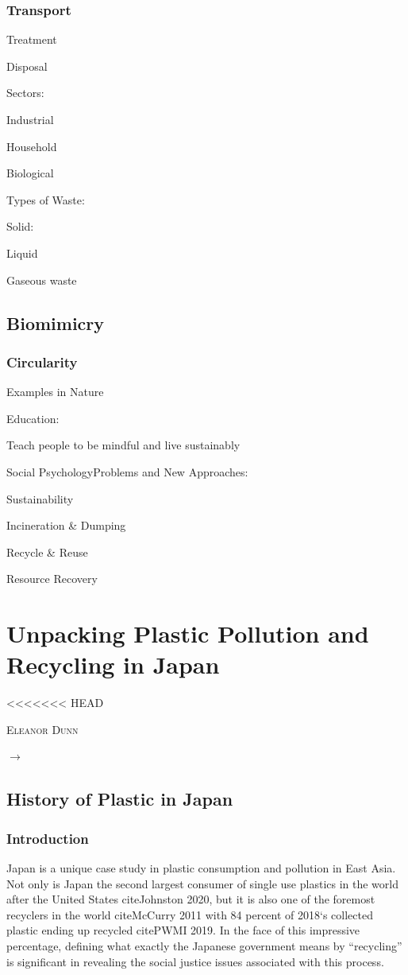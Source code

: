 \documentclass{book}\usepackage{knitr}
\makeatletter
\newcommand{\chapterauthor}[1]{%
  {\parindent0pt\vspace*{-25pt}%
  \linespread{1.1}\large\scshape#1%
  \par\nobreak\vspace*{35pt}}
  \@afterheading%
}
\makeatother
\begin{document}
\subsection{Transport}

Treatment

Disposal

Sectors:

Industrial

Household

Biological 

Types of Waste:

Solid:

Liquid

Gaseous waste

\section{Biomimicry}

\subsection{Circularity}

Examples in Nature

Education:

Teach people to be mindful and live sustainably

Social PsychologyProblems and New Approaches: 

Sustainability

Incineration \& Dumping

Recycle \& Reuse

Resource Recovery


\chapter{Unpacking Plastic Pollution and Recycling in Japan}
<<<<<<< HEAD

\chapterauthor{Eleanor Dunn}

$\rightarrow$

\section{History of Plastic in Japan}

\subsection{Introduction}

Japan is a unique case study in plastic consumption and pollution in East Asia. Not only is Japan the second largest consumer of single use plastics in the world after the United States citeJohnston 2020, but it is also one of the foremost recyclers in the world citeMcCurry 2011 with 84 percent of 2018`s collected plastic ending up recycled citePWMI 2019. In the face of this impressive percentage, defining what exactly the Japanese government means by ``recycling'' is significant in revealing the social justice issues associated with this process.
\end{document}
